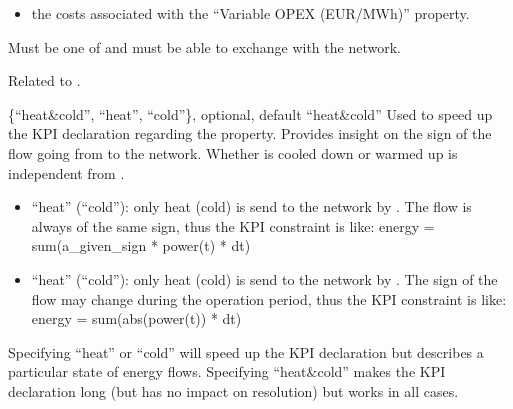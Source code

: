 \documentclass[letterpaper,10pt,english]{sphinxmanual}
\begin{document}
\begin{fulllineitems}
\begin{fulllineitems}
\begin{itemize}
\item {} 
\sphinxAtStartPar
the costs associated with the “Variable OPEX (EUR/MWh)” property.

\end{itemize}

\sphinxAtStartPar
Must be one of  and must be able to exchange  with the network.

\end{fulllineitems}


\begin{fulllineitems}
\label{\detokenize{generated/tamos.network.HREThermalNetwork:tamos.network.HREThermalNetwork.production_mode}}
\pysigstartsignatures
{}
\pysigstopsignatures
\sphinxAtStartPar
Related to .

\sphinxAtStartPar
\{“heat\&cold”, “heat”, “cold”\}, optional, default “heat\&cold”
Used to speed up the KPI declaration regarding the  property.
Provides insight on the sign of the flow going from  to the network.
Whether  is cooled down or warmed up is independent from .
\begin{itemize}
\item {} 
\sphinxAtStartPar
“heat” (“cold”): only heat (cold) is send to the network by .
The flow is always of the same sign, thus the KPI constraint is like:
energy = sum(a\_given\_sign * power(t) * dt)

\item {} 
\sphinxAtStartPar
“heat” (“cold”): only heat (cold) is send to the network by .
The sign of the flow may change during the operation period, thus the KPI constraint is like:
energy = sum(abs(power(t)) * dt)

\end{itemize}

\sphinxAtStartPar
Specifying “heat” or “cold” will speed up the KPI declaration but describes a particular state of energy flows.
Specifying “heat\&cold” makes the KPI declaration long (but has no impact on resolution) but works in all cases.


\end{fulllineitems}
\end{fulllineitems}
\end{document}
